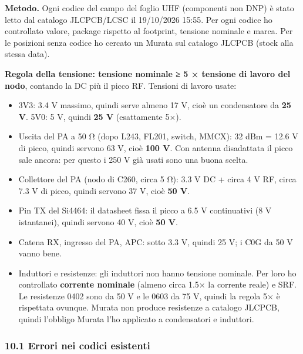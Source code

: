 \textbf{Metodo.} Ogni codice del campo  del foglio UHF (componenti non DNP) è stato letto dal catalogo JLCPCB/\allowbreak{}LCSC il 19/\allowbreak{}10/\allowbreak{}2026 15:55. Per ogni codice ho controllato valore, package rispetto al footprint, tensione nominale e marca. Per le posizioni senza codice ho cercato un Murata sul catalogo JLCPCB (stock alla stessa data).

\textbf{Regola della tensione: tensione nominale ≥ 5 × tensione di lavoro del nodo}, contando la DC più il picco RF. Tensioni di lavoro usate:

\begin{itemize}
\item 3V3: 3.4 V massimo, quindi serve almeno 17 V, cioè un condensatore da \textbf{25 V}. 5V0: 5 V, quindi \textbf{25 V} (esattamente 5×).
\item Uscita del PA a 50 Ω (dopo L243, FL201, switch, MMCX): 32 dBm = 12.6 V di picco, quindi servono 63 V, cioè \textbf{100 V}. Con antenna disadattata il picco sale ancora: per questo i 250 V già usati sono una buona scelta.
\item Collettore del PA (nodo di C260, circa 5 Ω): 3.3 V DC + circa 4 V RF, circa 7.3 V di picco, quindi servono 37 V, cioè \textbf{50 V}.
\item Pin TX del Si4464: il datasheet fissa il picco a 6.5 V continuativi (8 V istantanei), quindi servono 40 V, cioè \textbf{50 V}.
\item Catena RX, ingresso del PA, APC: sotto 3.3 V, quindi 25 V; i C0G da 50 V vanno bene.
\item Induttori e resistenze: gli induttori non hanno tensione nominale. Per loro ho controllato \textbf{corrente nominale} (almeno circa 1.5× la corrente reale) e SRF. Le resistenze 0402 sono da 50 V e le 0603 da 75 V, quindi la regola 5× è rispettata ovunque. Murata non produce resistenze a catalogo JLCPCB, quindi l'obbligo Murata l'ho applicato a condensatori e induttori.
\end{itemize}

\subsubsection[10.1 Errori nei codici esistenti]{10.1 Errori nei codici esistenti}

